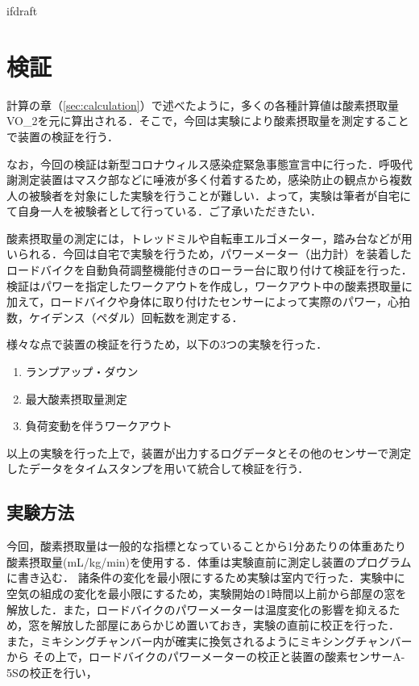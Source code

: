 \expandafter\ifx\csname ifdraft\endcsname\relax
 
\fi

\section{検証}

計算の章（\ref{sec:calculation}）で述べたように，多くの各種計算値は酸素摂取量VO_2を元に算出される．そこで，今回は実験により酸素摂取量を測定することで装置の検証を行う．

なお，今回の検証は新型コロナウィルス感染症緊急事態宣言中に行った．呼吸代謝測定装置はマスク部などに唾液が多く付着するため，感染防止の観点から複数人の被験者を対象にした実験を行うことが難しい．よって，実験は筆者が自宅にて自身一人を被験者として行っている．ご了承いただきたい．

酸素摂取量の測定には，トレッドミルや自転車エルゴメーター，踏み台などが用いられる．今回は自宅で実験を行うため，パワーメーター（出力計）を装着したロードバイクを自動負荷調整機能付きのローラー台に取り付けて検証を行った．
検証はパワーを指定したワークアウトを作成し，ワークアウト中の酸素摂取量に加えて，ロードバイクや身体に取り付けたセンサーによって実際のパワー，心拍数，ケイデンス（ペダル）回転数を測定する．

様々な点で装置の検証を行うため，以下の3つの実験を行った．

\begin{enumerate}
  \item ランプアップ・ダウン
  \item 最大酸素摂取量測定
  \item 負荷変動を伴うワークアウト
\end{enumerate}

以上の実験を行った上で，装置が出力するログデータとその他のセンサーで測定したデータをタイムスタンプを用いて統合して検証を行う．

\subsection{実験方法}

今回，酸素摂取量は一般的な指標となっていることから1分あたりの体重あたり酸素摂取量(mL/kg/min)を使用する．体重は実験直前に測定し装置のプログラムに書き込む．
諸条件の変化を最小限にするため実験は室内で行った．実験中に空気の組成の変化を最小限にするため，実験開始の1時間以上前から部屋の窓を解放した．また，ロードバイクのパワーメーターは温度変化の影響を抑えるため，窓を解放した部屋にあらかじめ置いておき，実験の直前に校正を行った．
また，ミキシングチャンバー内が確実に換気されるようにミキシングチャンバーから
その上で，ロードバイクのパワーメーターの校正と装置の酸素センサーA-5Sの校正を行い，

